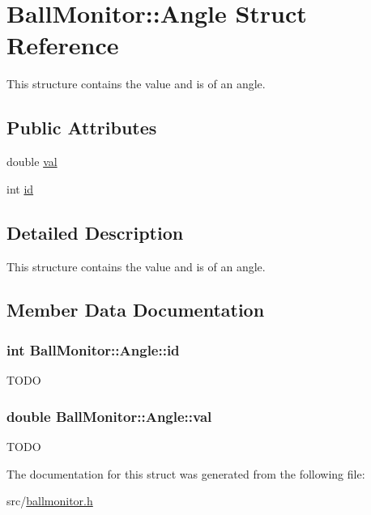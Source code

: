 \hypertarget{structBallMonitor_1_1Angle}{
\section{BallMonitor::Angle Struct Reference}
\label{structBallMonitor_1_1Angle}
}


This structure contains the value and is of an angle.  


\subsection*{Public Attributes}
\begin{DoxyCompactItemize}
\item 
double \hyperlink{structBallMonitor_1_1Angle_a78fc53a17705399300e15527aa9797dc}{val}
\item 
int \hyperlink{structBallMonitor_1_1Angle_a8c4cf98ad8b22adcc0bf58bd575185bf}{id}
\end{DoxyCompactItemize}


\subsection{Detailed Description}
This structure contains the value and is of an angle. 

\subsection{Member Data Documentation}
\hypertarget{structBallMonitor_1_1Angle_a8c4cf98ad8b22adcc0bf58bd575185bf}{
\subsubsection[{id}]{\setlength{\rightskip}{0pt plus 5cm}int {\bf BallMonitor::Angle::id}}}
\label{structBallMonitor_1_1Angle_a8c4cf98ad8b22adcc0bf58bd575185bf}
TODO \hypertarget{structBallMonitor_1_1Angle_a78fc53a17705399300e15527aa9797dc}{
\subsubsection[{val}]{\setlength{\rightskip}{0pt plus 5cm}double {\bf BallMonitor::Angle::val}}}
\label{structBallMonitor_1_1Angle_a78fc53a17705399300e15527aa9797dc}
TODO 

The documentation for this struct was generated from the following file:\begin{DoxyCompactItemize}
\item 
src/\hyperlink{ballmonitor_8h}{ballmonitor.h}\end{DoxyCompactItemize}

